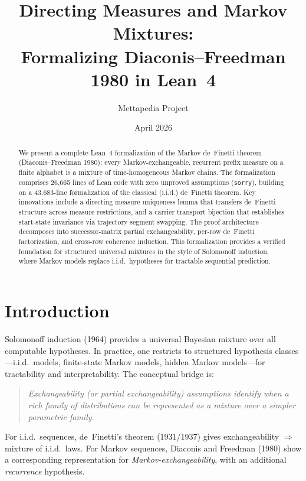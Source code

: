\documentclass[11pt,a4paper]{article}
\title{Directing Measures and Markov Mixtures:\\[0.3em]
\large Formalizing Diaconis--Freedman 1980 in Lean~4}
\author{Mettapedia Project}
\date{April 2026}
\theoremstyle{definition}
\begin{document}
\maketitle

\begin{abstract}
We present a complete Lean~4 formalization of the Markov de~Finetti theorem
(Diaconis--Freedman 1980): every Markov-exchangeable, recurrent prefix measure
on a finite alphabet is a mixture of time-homogeneous Markov chains. The
formalization comprises 26,665 lines of Lean code with zero unproved
assumptions (\texttt{sorry}), building on a 43,683-line formalization of the
classical (i.i.d.) de~Finetti theorem. Key innovations include a directing
measure uniqueness lemma that transfers de~Finetti structure across measure
restrictions, and a carrier transport bijection that establishes start-state
invariance via trajectory segment swapping. The proof architecture decomposes
into successor-matrix partial exchangeability, per-row de~Finetti factorization,
and cross-row coherence induction. This formalization provides a verified
foundation for structured universal mixtures in the style of Solomonoff
induction, where Markov models replace i.i.d.\ hypotheses for tractable
sequential prediction.
\end{abstract}

\tableofcontents

\section{Introduction}

Solomonoff induction (1964) provides a universal Bayesian mixture over all
computable hypotheses. In practice, one restricts to structured hypothesis
classes---i.i.d.\ models, finite-state Markov models, hidden Markov
models---for tractability and interpretability. The conceptual bridge is:

\begin{quote}
\emph{Exchangeability (or partial exchangeability) assumptions identify when
a rich family of distributions can be represented as a mixture over a simpler
parametric family.}
\end{quote}

For i.i.d.\ sequences, de~Finetti's theorem (1931/1937) gives exchangeability
$\Rightarrow$ mixture of i.i.d.\ laws. For Markov sequences, Diaconis and
Freedman (1980) show a corresponding representation for \emph{Markov-exchangeability},
with an additional \emph{recurrence} hypothesis.
\end{document}
